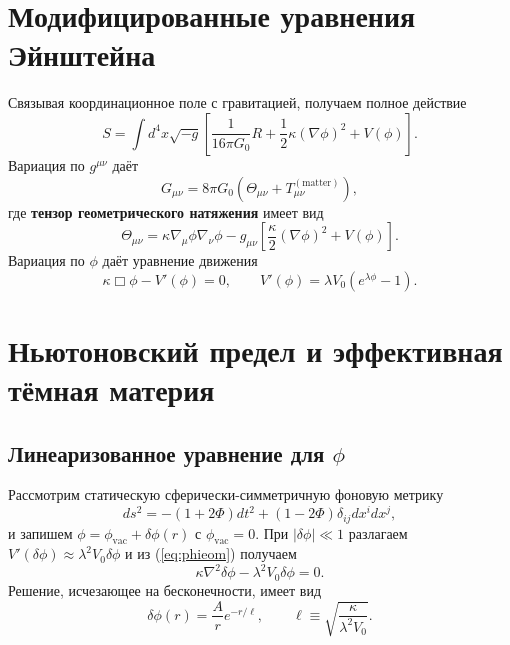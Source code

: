 \documentclass[12pt,a4paper]{article}
\begin{document}
	\section{Модифицированные уравнения Эйнштейна}
	
	Связывая координационное поле с гравитацией, получаем полное действие
	\begin{equation}
		S = \int d^4x \sqrt{-g} \left[ \frac{1}{16\pi G_0} R + \frac{1}{2}\kappa (\nabla\phi)^2 + V(\phi) \right].
		\label{eq:action}
	\end{equation}
	Вариация по \(g^{\mu\nu}\) даёт
	\begin{equation}
		G_{\mu\nu} = 8\pi G_0 \left( \Theta_{\mu\nu} + T_{\mu\nu}^{(\mathrm{matter})} \right),
		\label{eq:einstein}
	\end{equation}
	где \textbf{тензор геометрического натяжения} имеет вид
	\begin{equation}
		\Theta_{\mu\nu} = \kappa \nabla_\mu \phi \nabla_\nu \phi - g_{\mu\nu} \left[ \frac{\kappa}{2} (\nabla\phi)^2 + V(\phi) \right].
		\label{eq:Theta}
	\end{equation}
	Вариация по \(\phi\) даёт уравнение движения
	\begin{equation}
		\kappa \Box \phi - V'(\phi) = 0, \qquad V'(\phi) = \lambda V_0 \left( e^{\lambda\phi} - 1 \right).
		\label{eq:phieom}
	\end{equation}
	
	\section{Ньютоновский предел и эффективная тёмная материя}
	
	\subsection{Линеаризованное уравнение для \(\phi\)}
	Рассмотрим статическую сферически-симметричную фоновую метрику
	\[
	ds^2 = -(1+2\Phi)dt^2 + (1-2\Phi)\delta_{ij}dx^i dx^j,
	\]
	и запишем \(\phi = \phi_{\mathrm{vac}} + \delta\phi(r)\) с \(\phi_{\mathrm{vac}} = 0\). При \(|\delta\phi| \ll 1\) разлагаем \(V'(\delta\phi) \approx \lambda^2 V_0 \delta\phi\) и из (\ref{eq:phieom}) получаем
	\begin{equation}
		\kappa \nabla^2 \delta\phi - \lambda^2 V_0 \delta\phi = 0.
		\label{eq:lin-phi}
	\end{equation}
	Решение, исчезающее на бесконечности, имеет вид
	\begin{equation}
		\delta\phi(r) = \frac{A}{r} e^{-r/\ell}, \qquad \ell \equiv \sqrt{\frac{\kappa}{\lambda^2 V_0}}.
		\label{eq:deltaphi-sol}
	\end{equation}
	
\end{document}
